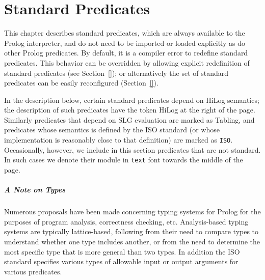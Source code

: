 \chapter{Standard Predicates} \label{standard}

This chapter describes standard predicates, which are always available
to the Prolog interpreter, and do not need to be imported or loaded
explicitly as do other Prolog predicates.  By default, it is a
compiler error to redefine standard predicates.  This behavior can be
overridden by allowing explicit redefinition of standard predicates
(see Section~\ref{}); or alternatively the set of standard predicates
can be easily reconfigured (Section~\ref{}).

In the description below, certain standard predicates depend on HiLog
semantics; the description of such predicates have the token {\sf
HiLog} at the right of the page.  Similarly predicates that depend on
SLG evaluation are marked as {\sf Tabling}, and predicates whose
semantics is defined by the ISO standard (or whose implementation is
reasonably close to that definition) are marked as {\tt ISO}.
Occasionally, however, we include in this section predicates that are
not standard.  In such cases we denote their module in {\tt text} font
towards the middle of the page.

\paragraph*{A Note on Types} \label{sec:types}

Numerous proposals have been made concerning typing systems for Prolog
for the purposes of program analysis, correctness checking, etc.
Analysis-based typing systems are typically lattice-based, following
from their need to compare types to understand whether one type
includes another, or from the need to determine the most specific type
that is more general than two types.  In addition the ISO standard
specifies various types of allowable input or output arguments for
various predicates.

